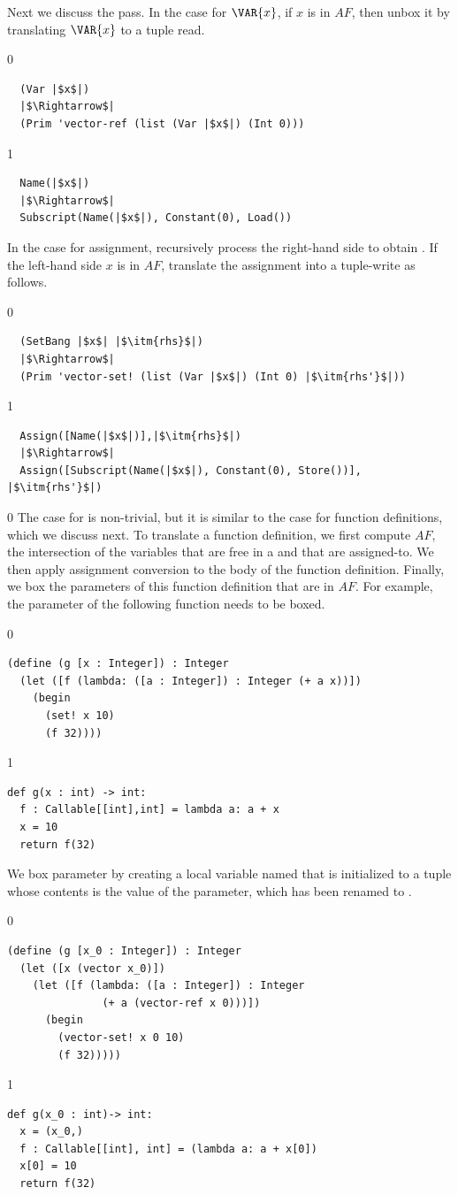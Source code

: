 \documentclass[7x10]{TimesAPriori_MIT}%
\def\racketEd{0}
\def\pythonEd{1}
\def\edition{0}
\numberwithin{theorem}{chapter}
\numberwithin{definition}{chapter}
\numberwithin{equation}{chapter}
\begin{document}
Next we discuss the  pass.  In the case for
$\VAR{x}$, if $x$ is in $\mathit{AF}$, then unbox it by translating
$\VAR{x}$ to a tuple read.
%
{\if\edition\racketEd
\begin{lstlisting}
  (Var |$x$|)
  |$\Rightarrow$|
  (Prim 'vector-ref (list (Var |$x$|) (Int 0)))
\end{lstlisting}
\fi}
%
{\if\edition\pythonEd
\begin{lstlisting}
  Name(|$x$|)
  |$\Rightarrow$|
  Subscript(Name(|$x$|), Constant(0), Load())
\end{lstlisting}
\fi}
%
\noindent In the case for assignment, recursively process the
right-hand side  to obtain .  If the left-hand side
$x$ is in $\mathit{AF}$, translate the assignment into a tuple-write
as follows.
%
{\if\edition\racketEd
\begin{lstlisting}
  (SetBang |$x$| |$\itm{rhs}$|)
  |$\Rightarrow$|
  (Prim 'vector-set! (list (Var |$x$|) (Int 0) |$\itm{rhs'}$|))
\end{lstlisting}
\fi}
{\if\edition\pythonEd
\begin{lstlisting}
  Assign([Name(|$x$|)],|$\itm{rhs}$|)
  |$\Rightarrow$|
  Assign([Subscript(Name(|$x$|), Constant(0), Store())], |$\itm{rhs'}$|)
\end{lstlisting}
\fi}
%
{\if\edition\racketEd
The case for  is non-trivial, but it is similar to the
case for function definitions, which we discuss next.
\fi}
%
To translate a function definition, we first compute $\mathit{AF}$,
the intersection of the variables that are free in a  and
that are assigned-to. We then apply assignment conversion to the body
of the function definition. Finally, we box the parameters of this
function definition that are in $\mathit{AF}$. For example,
the parameter  of the following function 
needs to be boxed.
{\if\edition\racketEd
\begin{lstlisting}
(define (g [x : Integer]) : Integer
  (let ([f (lambda: ([a : Integer]) : Integer (+ a x))])
    (begin
      (set! x 10)
      (f 32))))
\end{lstlisting}
\fi}
%
{\if\edition\pythonEd
\begin{lstlisting}
def g(x : int) -> int:
  f : Callable[[int],int] = lambda a: a + x
  x = 10
  return f(32)
\end{lstlisting}
\fi}
%
\noindent We box parameter  by creating a local variable named
 that is initialized to a tuple whose contents is the value of
the parameter, which has been renamed to .
%
{\if\edition\racketEd
\begin{lstlisting}
(define (g [x_0 : Integer]) : Integer
  (let ([x (vector x_0)])
    (let ([f (lambda: ([a : Integer]) : Integer
               (+ a (vector-ref x 0)))])
      (begin 
        (vector-set! x 0 10)
        (f 32)))))
\end{lstlisting}
\fi}
%
{\if\edition\pythonEd
\begin{lstlisting}
def g(x_0 : int)-> int:
  x = (x_0,)
  f : Callable[[int], int] = (lambda a: a + x[0])
  x[0] = 10
  return f(32)
\end{lstlisting}
\fi}
\end{document}
